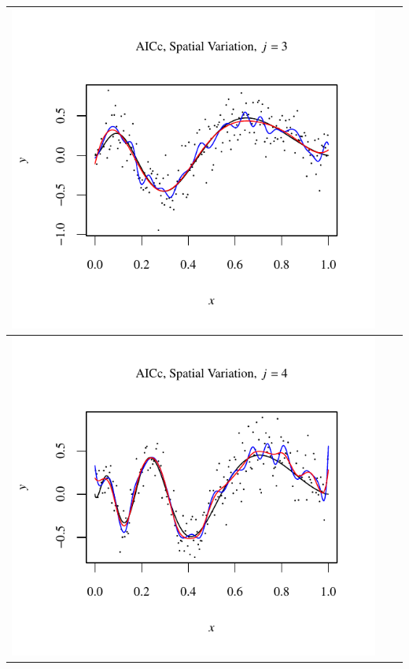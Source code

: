 \documentclass[11pt]{article}
\begin{document}
\begin{table}[h!]
\begin{center}
\begin{tabular}{| >{\centering\arraybackslash}m{2.1in} |  >{\centering\arraybackslash}m{2.1in} |  >{\centering\arraybackslash}m{2.1in}|}
      \includegraphics[width=1\linewidth,height=0.18\textheight]{Graphs/3/3/assignment5_a_3_3_3}\\\hline
      \includegraphics[width=1\linewidth,height=0.18\textheight]{Graphs/3/3/assignment5_a_3_3_4}&

\end{tabular}
\end{center}
\end{table}
\end{document}
